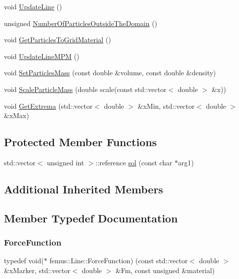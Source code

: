 \begin{DoxyCompactItemize}
void \mbox{\hyperlink{classfemus_1_1_line_a9350d9ca920977a8771356e2f7cd04c1}{Update\+Line}} ()
\item 
unsigned \mbox{\hyperlink{classfemus_1_1_line_a2b8a19a410213e8a7cd8fb2118cc4305}{Number\+Of\+Particles\+Outside\+The\+Domain}} ()
\item 
void \mbox{\hyperlink{classfemus_1_1_line_a6133aaf46e19085a1e7c231112fef552}{Get\+Particles\+To\+Grid\+Material}} ()
\item 
void \mbox{\hyperlink{classfemus_1_1_line_a925825ecec878fca65291705b9b8c499}{Update\+Line\+M\+PM}} ()
\item 
void \mbox{\hyperlink{classfemus_1_1_line_af55b5ea90edb20e5accc0c41aaeddddd}{Set\+Particles\+Mass}} (const double \&volume, const double \&density)
\item 
void \mbox{\hyperlink{classfemus_1_1_line_a9c671365287a5f89ee2682bcee9dbcc2}{Scale\+Particle\+Mass}} (double scale(const std\+::vector$<$ double $>$ \&x))
\item 
void \mbox{\hyperlink{classfemus_1_1_line_aa08f01ce094ab356465008c38a1c0171}{Get\+Extrema}} (std\+::vector$<$ double $>$ \&x\+Min, std\+::vector$<$ double $>$ \&x\+Max)
\end{DoxyCompactItemize}
\subsection*{Protected Member Functions}
\begin{DoxyCompactItemize}
\item 
std\+::vector$<$ unsigned int $>$\+::reference \mbox{\hyperlink{classfemus_1_1_line_a6f026b817f6622d68af15ba6b9f72b58}{sol}} (const char $\ast$arg1)
\end{DoxyCompactItemize}
\subsection*{Additional Inherited Members}


\subsection{Member Typedef Documentation}
\mbox{\label{classfemus_1_1_line_a34a5fe4198ea2eb339bffeef484ae77e}} 
\subsubsection{\texorpdfstring{Force\+Function}{ForceFunction}}
{\footnotesize\ttfamily typedef void($\ast$ femus\+::\+Line\+::\+Force\+Function) (const std\+::vector$<$ double $>$ \&x\+Marker, std\+::vector$<$ double $>$ \&Fm, const unsigned \&material)}



